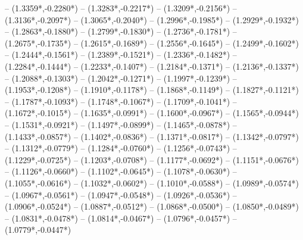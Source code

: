 {	-- ({1.3359*\dx},{-0.2280*\dy})
	-- ({1.3283*\dx},{-0.2217*\dy})
	-- ({1.3209*\dx},{-0.2156*\dy})
	-- ({1.3136*\dx},{-0.2097*\dy})
	-- ({1.3065*\dx},{-0.2040*\dy})
	-- ({1.2996*\dx},{-0.1985*\dy})
	-- ({1.2929*\dx},{-0.1932*\dy})
	-- ({1.2863*\dx},{-0.1880*\dy})
	-- ({1.2799*\dx},{-0.1830*\dy})
	-- ({1.2736*\dx},{-0.1781*\dy})
	-- ({1.2675*\dx},{-0.1735*\dy})
	-- ({1.2615*\dx},{-0.1689*\dy})
	-- ({1.2556*\dx},{-0.1645*\dy})
	-- ({1.2499*\dx},{-0.1602*\dy})
	-- ({1.2444*\dx},{-0.1561*\dy})
	-- ({1.2389*\dx},{-0.1521*\dy})
	-- ({1.2336*\dx},{-0.1482*\dy})
	-- ({1.2284*\dx},{-0.1444*\dy})
	-- ({1.2233*\dx},{-0.1407*\dy})
	-- ({1.2184*\dx},{-0.1371*\dy})
	-- ({1.2136*\dx},{-0.1337*\dy})
	-- ({1.2088*\dx},{-0.1303*\dy})
	-- ({1.2042*\dx},{-0.1271*\dy})
	-- ({1.1997*\dx},{-0.1239*\dy})
	-- ({1.1953*\dx},{-0.1208*\dy})
	-- ({1.1910*\dx},{-0.1178*\dy})
	-- ({1.1868*\dx},{-0.1149*\dy})
	-- ({1.1827*\dx},{-0.1121*\dy})
	-- ({1.1787*\dx},{-0.1093*\dy})
	-- ({1.1748*\dx},{-0.1067*\dy})
	-- ({1.1709*\dx},{-0.1041*\dy})
	-- ({1.1672*\dx},{-0.1015*\dy})
	-- ({1.1635*\dx},{-0.0991*\dy})
	-- ({1.1600*\dx},{-0.0967*\dy})
	-- ({1.1565*\dx},{-0.0944*\dy})
	-- ({1.1531*\dx},{-0.0921*\dy})
	-- ({1.1497*\dx},{-0.0899*\dy})
	-- ({1.1465*\dx},{-0.0878*\dy})
	-- ({1.1433*\dx},{-0.0857*\dy})
	-- ({1.1402*\dx},{-0.0836*\dy})
	-- ({1.1371*\dx},{-0.0817*\dy})
	-- ({1.1342*\dx},{-0.0797*\dy})
	-- ({1.1312*\dx},{-0.0779*\dy})
	-- ({1.1284*\dx},{-0.0760*\dy})
	-- ({1.1256*\dx},{-0.0743*\dy})
	-- ({1.1229*\dx},{-0.0725*\dy})
	-- ({1.1203*\dx},{-0.0708*\dy})
	-- ({1.1177*\dx},{-0.0692*\dy})
	-- ({1.1151*\dx},{-0.0676*\dy})
	-- ({1.1126*\dx},{-0.0660*\dy})
	-- ({1.1102*\dx},{-0.0645*\dy})
	-- ({1.1078*\dx},{-0.0630*\dy})
	-- ({1.1055*\dx},{-0.0616*\dy})
	-- ({1.1032*\dx},{-0.0602*\dy})
	-- ({1.1010*\dx},{-0.0588*\dy})
	-- ({1.0989*\dx},{-0.0574*\dy})
	-- ({1.0967*\dx},{-0.0561*\dy})
	-- ({1.0947*\dx},{-0.0548*\dy})
	-- ({1.0926*\dx},{-0.0536*\dy})
	-- ({1.0906*\dx},{-0.0524*\dy})
	-- ({1.0887*\dx},{-0.0512*\dy})
	-- ({1.0868*\dx},{-0.0500*\dy})
	-- ({1.0850*\dx},{-0.0489*\dy})
	-- ({1.0831*\dx},{-0.0478*\dy})
	-- ({1.0814*\dx},{-0.0467*\dy})
	-- ({1.0796*\dx},{-0.0457*\dy})
	-- ({1.0779*\dx},{-0.0447*\dy})
}
